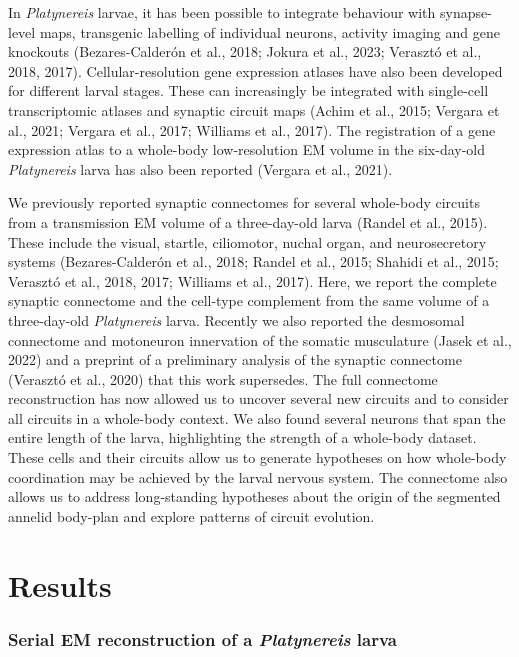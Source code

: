 \documentclass[
  11pt,
]{article}
\begin{document}
In \emph{Platynereis} larvae, it has been possible to integrate
behaviour with synapse-level maps, transgenic labelling of individual
neurons, activity imaging and gene knockouts (Bezares-Calderón et al.,
2018; Jokura et al., 2023; Verasztó et al., 2018, 2017).
Cellular-resolution gene expression atlases have also been developed for
different larval stages. These can increasingly be integrated with
single-cell transcriptomic atlases and synaptic circuit maps (Achim et
al., 2015; Vergara et al., 2021; Vergara et al., 2017; Williams et al.,
2017). The registration of a gene expression atlas to a whole-body
low-resolution EM volume in the six-day-old \emph{Platynereis} larva has
also been reported (Vergara et al., 2021).

We previously reported synaptic connectomes for several whole-body
circuits from a transmission EM volume of a three-day-old larva (Randel
et al., 2015). These include the visual, startle, ciliomotor, nuchal
organ, and neurosecretory systems (Bezares-Calderón et al., 2018; Randel
et al., 2015; Shahidi et al., 2015; Verasztó et al., 2018, 2017;
Williams et al., 2017). Here, we report the complete synaptic connectome
and the cell-type complement from the same volume of a three-day-old
\emph{Platynereis} larva. Recently we also reported the desmosomal
connectome and motoneuron innervation of the somatic musculature (Jasek
et al., 2022) and a preprint of a preliminary analysis of the synaptic
connectome (Verasztó et al., 2020) that this work supersedes. The full
connectome reconstruction has now allowed us to uncover several new
circuits and to consider all circuits in a whole-body context. We also
found several neurons that span the entire length of the larva,
highlighting the strength of a whole-body dataset. These cells and their
circuits allow us to generate hypotheses on how whole-body coordination
may be achieved by the larval nervous system. The connectome also allows
us to address long-standing hypotheses about the origin of the segmented
annelid body-plan and explore patterns of circuit evolution.

\section{Results}\label{results}

\subsubsection{\texorpdfstring{Serial EM reconstruction of a
\emph{Platynereis}
larva}{Serial EM reconstruction of a Platynereis larva}}\label{serial-em-reconstruction-of-a-platynereis-larva}
\end{document}
